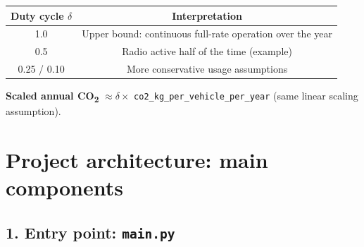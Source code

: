 \documentclass[conference]{IEEEtran}
\begin{document}
\begin{center}
\begin{tabular}{|c|c|}
\hline
\textbf{Duty cycle $\delta$} & \textbf{Interpretation} \\
\hline
1.0 & Upper bound: continuous full-rate operation over the year \\
\hline
0.5 & Radio active half of the time (example) \\
\hline
0.25 / 0.10 & More conservative usage assumptions \\
\hline
\end{tabular}
\end{center}

\noindent\textbf{Scaled annual CO\textsubscript{2}} $\approx \delta \times$ \texttt{co2\_kg\_per\_vehicle\_per\_year} (same linear scaling assumption).


\section{Project architecture: main components}

\subsection{1. Entry point: \texttt{main.py}}
\end{document}
